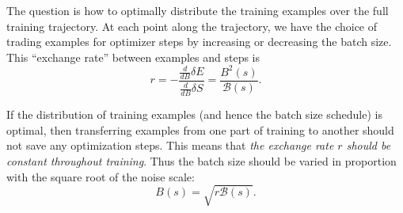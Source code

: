 \documentclass[english]{article}
\begin{document}
The question is how to optimally distribute the training examples over the full training trajectory. At each point along the trajectory, we have the choice of trading examples for optimizer steps by increasing or decreasing the batch size. This ``exchange rate'' between examples and steps is
\begin{equation}
r=-\frac{\frac{d}{dB}\delta E}{\frac{d}{dB}\delta S}=\frac{B^{2}(s)}{\mathcal{B}(s)}.
\end{equation}

If the distribution of training examples (and hence the batch size schedule) is optimal, then transferring examples from one part of training to another should not save any optimization steps. This means that \emph{the exchange rate $r$ should be constant throughout training}. Thus the batch size should be varied in proportion with the square root of the noise scale:
\begin{equation}
B(s)=\sqrt{r\mathcal{B}(s)}.\label{eq:best-variable-batch-size}
\end{equation}
\end{document}
